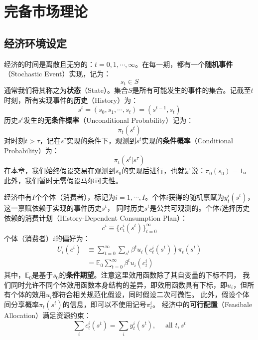 
\section{完备市场理论}  \label{sec-complete-market}


\subsection{经济环境设定}

经济的时间是离散且无穷的：$t=0,1,\cdots, \infty$。在每一期，都有一个\textbf{随机事件}（Stochastic Event）实现，记为：
$$s_t\in S$$
通常我们将其称之为\textbf{状态}（State）。集合$S$是所有可能发生的事件的集合。记截至$t$时刻，所有实现事件的\textbf{历史}（History）为：
$$s^t = \left(s_0,s_1,\cdots,s_t\right) = \left(s^{t-1},s_t\right)$$
历史$s^t$发生的\textbf{无条件概率}（Unconditional Probability）记为：
$$\pi_t\left(s^t\right)$$
对时刻$t>\tau$，记在$s^{\tau}$实现的条件下，观测到$s^t$实现的\textbf{条件概率}（Conditional Probability）为：
$$\pi_t\left(s^t|s^{\tau}\right)$$
在本章，我们始终假设交易在观测到$s_0$的实现后进行，也就是说：$\pi_0\left(s_0\right)=1$。此外，我们暂时无需假设马尔可夫性。

经济中有$I$个个体（消费者），标记为$i=1,\cdots, I$。个体$i$获得的随机禀赋为$y_t^i\left(s^t\right)$，这一禀赋依赖于实现的事件历史$s^t$，
同时历史$s^t$是公共可观测的。个体$i$选择历史依赖的消费计划（History-Dependent Consumption Plan）：
$$
c^i \equiv \{c_t^i\left(s^t\right)\}_{t=0}^{\infty}
$$
个体（消费者）$i$的偏好为：
\begin{equation}    \label{eq-cm-preference-i}
    \begin{aligned}
        U_i\left(c^i\right) &\equiv \sum_{t=0}^{\infty} \sum_{s^t} \beta^t u_i\left(c_t^i\left(s^t\right)\right) \pi_t\left(s^t\right) \\
            &= \mathbb{E}_0 \sum_{t=0}^{\infty} \beta^t u_i\left(c_t^i\right)
    \end{aligned}
\end{equation}
其中，$\mathbb{E}_0$是基于$s_0$的\textbf{条件期望}。注意这里效用函数除了其自变量的下标不同，
我们同时允许不同个体效用函数本身结构的差异，即效用函数具有下标，即$u_i$，但所有个体的效用$u_i$都符合相关规范化假设，同时假设二次可微性。
此外，假设个体间分享概率$\pi_t\left(s^t\right)$的信息，即可以不使用记号$\pi_t^i$。
经济中的\textbf{可行配置}（Feasibale Allocation）满足资源约束：
\begin{equation}    \label{eq-cm-rc}
    \sum_i c_t^i\left(s^t\right) = \sum_i y_t^i\left(s^t\right), \quad \text { all } t, s^t
\end{equation}


